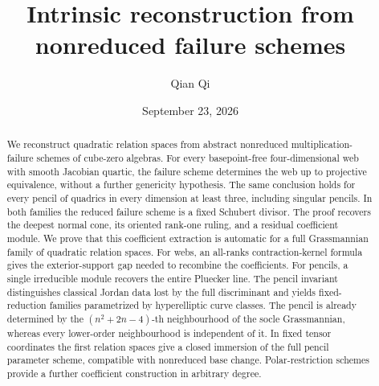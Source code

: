 \title[Intrinsic reconstruction from failure schemes]{Intrinsic reconstruction from nonreduced failure schemes}
\author{Qian Qi}
\date{September 23, 2026}
\begin{abstract}
We reconstruct quadratic relation spaces from abstract nonreduced
multiplication-failure schemes of cube-zero algebras.  For every
basepoint-free four-dimensional web with smooth Jacobian quartic,
the failure scheme determines the web up to projective equivalence,
without a further genericity hypothesis.  The same conclusion holds
for every pencil of quadrics in every dimension at least three,
including singular pencils.  In both families the reduced failure
scheme is a fixed Schubert divisor.  The proof recovers the deepest
normal cone, its oriented rank-one ruling, and a residual coefficient
module.  We prove that this coefficient extraction is automatic for
a full Grassmannian family of quadratic relation spaces.  For webs,
an all-ranks contraction-kernel formula gives the exterior-support
gap needed to recombine the coefficients.  For pencils, a single
irreducible module recovers the entire Pluecker line.  The pencil
invariant distinguishes classical Jordan data lost by the full
discriminant and yields fixed-reduction families parametrized by
hyperelliptic curve classes.  The pencil is already determined by the
\((n^2+2n-4)\)-th neighbourhood of the socle Grassmannian,
whereas every lower-order neighbourhood is independent of it.
In fixed tensor coordinates the first relation spaces give a
closed immersion of the full pencil parameter scheme, compatible
with nonreduced base change.  Polar-restriction schemes provide a
further coefficient construction in arbitrary degree.
\end{abstract}
\maketitle
